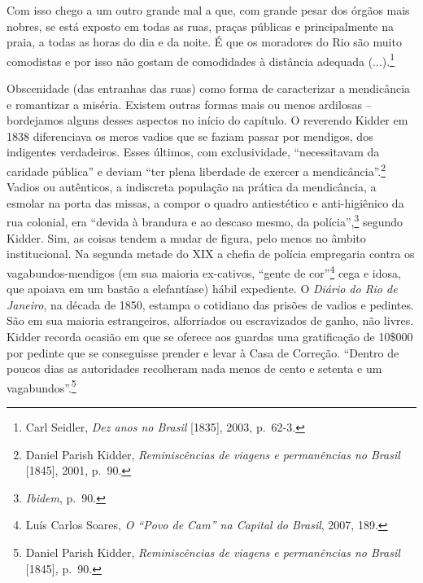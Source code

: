 Com isso chego a um outro grande mal a que, com grande pesar dos órgãos
mais nobres, se está exposto em todas as ruas, praças públicas e
principalmente na praia, a todas as horas do dia e da noite. É que os
moradores do Rio são muito comodistas e por isso não gostam de
comodidades à distância adequada (...).\footnote{Carl Seidler, \emph{Dez
  anos no Brasil} {[}1835{]}, 2003, p.~62-3.}

Obscenidade (das entranhas das ruas) como forma de caracterizar a
mendicância e romantizar a miséria. Existem outras formas mais ou menos
ardilosas -- bordejamos alguns desses aspectos no início do capítulo. O
reverendo Kidder em 1838 diferenciava os meros vadios que se faziam
passar por mendigos, dos indigentes verdadeiros. Esses últimos, com
exclusividade, ``necessitavam da caridade pública'' e deviam ``ter plena
liberdade de exercer a mendicância''.\footnote{Daniel Parish Kidder,
  \emph{Reminiscências de viagens e permanências no Brasil} {[}1845{]},
  2001, p.~90.} Vadios ou autênticos, a indiscreta população na prática
da mendicância, a esmolar na porta das missas, a compor o quadro
antiestético e anti-higiênico da rua colonial, era ``devida à brandura e
ao descaso mesmo, da polícia'',\footnote{\emph{Ibidem}, p.~90.} segundo
Kidder. Sim, as coisas tendem a mudar de figura, pelo menos no âmbito
institucional. Na segunda metade do XIX a chefia de polícia empregaria
contra os vagabundos-mendigos (em sua maioria ex-cativos, ``gente de
cor''\footnote{Luís Carlos Soares, \emph{O ``Povo de Cam'' na Capital do
  Brasil}, 2007, 189.} cega e idosa, que apoiava em um bastão a
elefantíase) hábil expediente. O \emph{Diário do Rio de Janeiro}, na
década de 1850, estampa o cotidiano das prisões de vadios e pedintes.
São em sua maioria estrangeiros, alforriados ou escravizados de ganho,
não livres. Kidder recorda ocasião em que se oferece aos guardas uma
gratificação de 10\$000 por pedinte que se conseguisse prender e levar à
Casa de Correção. ``Dentro de poucos dias as autoridades recolheram nada
menos de cento e setenta e um vagabundos''.\footnote{Daniel Parish
  Kidder, \emph{Reminiscências de viagens e permanências no Brasil}
  {[}1845{]}\emph{,} p.~90.}

